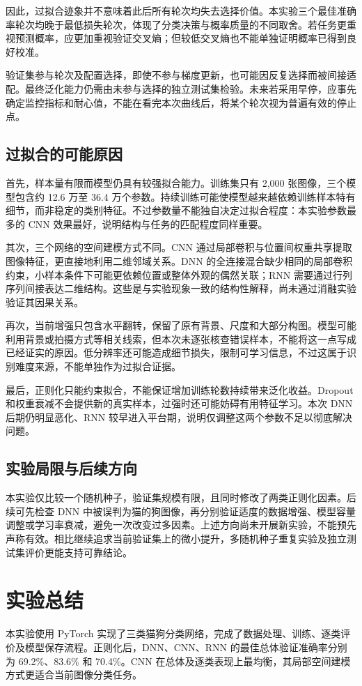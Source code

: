 \documentclass[UTF8,a4paper,zihao=-4,fontset=fandol]{ctexart}
\begin{document}
因此，过拟合迹象并不意味着此后所有轮次均失去选择价值。本实验三个最佳准确率轮次均晚于最低损失轮次，体现了分类决策与概率质量的不同取舍。若任务更重视预测概率，应更加重视验证交叉熵；但较低交叉熵也不能单独证明概率已得到良好校准。

验证集参与轮次及配置选择，即使不参与梯度更新，也可能因反复选择而被间接适配。最终泛化能力仍需由未参与选择的独立测试集检验。未来若采用早停，应事先确定监控指标和耐心值，不能在看完本次曲线后，将某个轮次视为普遍有效的停止点。

\subsection{过拟合的可能原因}
首先，样本量有限而模型仍具有较强拟合能力。训练集只有 2,000 张图像，三个模型包含约 12.6 万至 36.4 万个参数。持续训练可能使模型越来越依赖训练样本特有细节，而非稳定的类别特征。不过参数量不能独自决定过拟合程度：本实验参数最多的 CNN 效果最好，说明结构与任务的匹配程度同样重要。

其次，三个网络的空间建模方式不同。CNN 通过局部卷积与位置间权重共享提取图像特征，更直接地利用二维邻域关系。DNN 的全连接混合缺少相同的局部卷积约束，小样本条件下可能更依赖位置或整体外观的偶然关联；RNN 需要通过行列序列间接表达二维结构。这些是与实验现象一致的结构性解释，尚未通过消融实验验证其因果关系。

再次，当前增强只包含水平翻转，保留了原有背景、尺度和大部分构图。模型可能利用背景或拍摄方式等相关线索，但本次未逐张核查错误样本，不能将这一点写成已经证实的原因。低分辨率还可能造成细节损失，限制可学习信息，不过这属于识别难度来源，不能单独作为过拟合证据。

最后，正则化只能约束拟合，不能保证增加训练轮数持续带来泛化收益。Dropout 和权重衰减不会提供新的真实样本，过强时还可能妨碍有用特征学习。本次 DNN 后期仍明显恶化、RNN 较早进入平台期，说明仅调整这两个参数不足以彻底解决问题。

\subsection{实验局限与后续方向}
本实验仅比较一个随机种子，验证集规模有限，且同时修改了两类正则化因素。后续可先检查 DNN 中被误判为猫的狗图像，再分别验证适度的数据增强、模型容量调整或学习率衰减，避免一次改变过多因素。上述方向尚未开展新实验，不能预先声称有效。相比继续追求当前验证集上的微小提升，多随机种子重复实验及独立测试集评价更能支持可靠结论。

\section{实验总结}
本实验使用 PyTorch 实现了三类猫狗分类网络，完成了数据处理、训练、逐类评价及模型保存流程。正则化后，DNN、CNN、RNN 的最佳总体验证准确率分别为 69.2\%、83.6\% 和 70.4\%。CNN 在总体及逐类表现上最均衡，其局部空间建模方式更适合当前图像分类任务。
\end{document}

